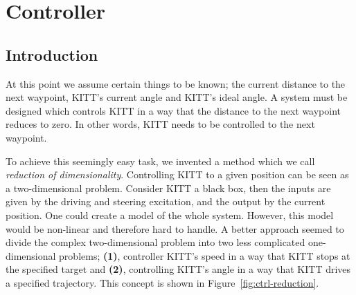 \documentclass[11pt,titlepage]{report}
\begin{document}
\chapter{Controller}
\label{ch:control}
\section{Introduction}
At this point we assume certain things to be known; the current distance to the next waypoint, KITT's current angle and KITT's ideal angle. A system must be designed which controls KITT in a way that the distance to the next waypoint reduces to zero. In other words, KITT needs to be controlled to the next waypoint.

To achieve this seemingly easy task, we invented a method which we call \textit{reduction of dimensionality}. Controlling KITT to a given position can be seen as a two-dimensional problem. Consider KITT a black box, then the inputs are given by the driving and steering excitation, and the output by the current position. One could create a model of the whole system. However, this model would be non-linear and therefore hard to handle. A better approach seemed to divide the complex two-dimensional problem into two less complicated one-dimensional problems; \textbf{(1)}, controller KITT's speed in a way that KITT stops at the specified target and \textbf{(2)}, controlling KITT's angle in a way that KITT drives a specified trajectory. This concept is shown in Figure~\ref{fig:ctrl-reduction}.
\end{document}
